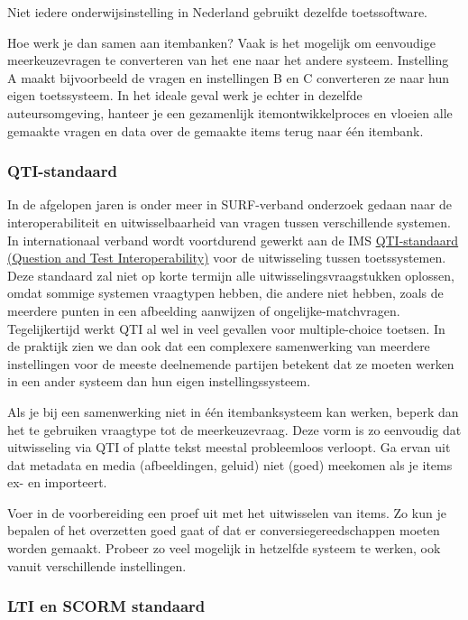 \documentclass[
]{book}
\begin{document}
Niet iedere onderwijsinstelling in Nederland gebruikt dezelfde toetssoftware.

Hoe werk je dan samen aan itembanken? Vaak is het mogelijk om eenvoudige meerkeuzevragen te converteren van het ene naar het andere systeem. Instelling A maakt bijvoorbeeld de vragen en instellingen B en C converteren ze naar hun eigen toetssysteem. In het ideale geval werk je echter in dezelfde auteursomgeving, hanteer je een gezamenlijk itemontwikkelproces en vloeien alle gemaakte vragen en data over de gemaakte items terug naar één itembank.

\hypertarget{qti-standaard}{%
\subsubsection{QTI-standaard}\label{qti-standaard}}

In de afgelopen jaren is onder meer in SURF-verband onderzoek gedaan naar de interoperabiliteit en uitwisselbaarheid van vragen tussen verschillende systemen. In internationaal verband wordt voortdurend gewerkt aan de IMS \href{https://www.imsglobal.org/question/index.html}{QTI-standaard (Question and Test Interoperability)} voor de uitwisseling tussen toetssystemen. Deze standaard zal niet op korte termijn alle uitwisselingsvraagstukken oplossen, omdat sommige systemen vraagtypen hebben, die andere niet hebben, zoals de meerdere punten in een afbeelding aanwijzen of ongelijke-matchvragen. Tegelijkertijd werkt QTI al wel in veel gevallen voor multiple-choice toetsen. In de praktijk zien we dan ook dat een complexere samenwerking van meerdere instellingen voor de meeste deelnemende partijen betekent dat ze moeten werken in een ander systeem dan hun eigen instellingssysteem.

Als je bij een samenwerking niet in één itembanksysteem kan werken, beperk dan het te gebruiken vraagtype tot de meerkeuzevraag. Deze vorm is zo eenvoudig dat uitwisseling via QTI of platte tekst meestal probleemloos verloopt. Ga ervan uit dat metadata en media (afbeeldingen, geluid) niet (goed) meekomen als je items ex- en importeert.

Voer in de voorbereiding een proef uit met het uitwisselen van items. Zo kun je bepalen of het overzetten goed gaat of dat er conversiegereedschappen moeten worden gemaakt. Probeer zo veel mogelijk in hetzelfde systeem te werken, ook vanuit verschillende instellingen.

\hypertarget{lti-en-scorm-standaard}{%
\subsubsection{LTI en SCORM standaard}\label{lti-en-scorm-standaard}}
\end{document}
